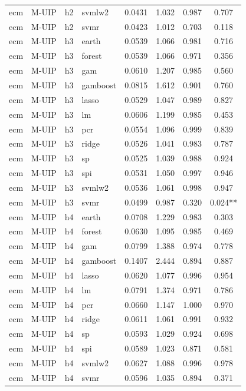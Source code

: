 \begin{ThreePartTable}
\begin{longtable}[t]{llclcccc}
ecm & M-UIP & h2 & svmlw2 & 0.0431 & 1.032 & 0.987 & 0.707\\
ecm & M-UIP & h2 & svmr & 0.0423 & 1.012 & 0.703 & 0.118\\
\addlinespace
ecm & M-UIP & h3 & earth & 0.0539 & 1.066 & 0.981 & 0.716\\
ecm & M-UIP & h3 & forest & 0.0539 & 1.066 & 0.971 & 0.356\\
ecm & M-UIP & h3 & gam & 0.0610 & 1.207 & 0.985 & 0.560\\
ecm & M-UIP & h3 & gamboost & 0.0815 & 1.612 & 0.901 & 0.760\\
ecm & M-UIP & h3 & lasso & 0.0529 & 1.047 & 0.989 & 0.827\\
ecm & M-UIP & h3 & lm & 0.0606 & 1.199 & 0.985 & 0.453\\
ecm & M-UIP & h3 & pcr & 0.0554 & 1.096 & 0.999 & 0.839\\
ecm & M-UIP & h3 & ridge & 0.0526 & 1.041 & 0.983 & 0.787\\
ecm & M-UIP & h3 & sp & 0.0525 & 1.039 & 0.988 & 0.924\\
ecm & M-UIP & h3 & spi & 0.0531 & 1.050 & 0.997 & 0.946\\
ecm & M-UIP & h3 & svmlw2 & 0.0536 & 1.061 & 0.998 & 0.947\\
ecm & M-UIP & h3 & svmr & 0.0499 & 0.987 & 0.320 & 0.024**\\
\addlinespace
ecm & M-UIP & h4 & earth & 0.0708 & 1.229 & 0.983 & 0.303\\
ecm & M-UIP & h4 & forest & 0.0630 & 1.095 & 0.985 & 0.469\\
ecm & M-UIP & h4 & gam & 0.0799 & 1.388 & 0.974 & 0.778\\
ecm & M-UIP & h4 & gamboost & 0.1407 & 2.444 & 0.894 & 0.887\\
ecm & M-UIP & h4 & lasso & 0.0620 & 1.077 & 0.996 & 0.954\\
ecm & M-UIP & h4 & lm & 0.0791 & 1.374 & 0.971 & 0.786\\
ecm & M-UIP & h4 & pcr & 0.0660 & 1.147 & 1.000 & 0.970\\
ecm & M-UIP & h4 & ridge & 0.0611 & 1.061 & 0.991 & 0.932\\
ecm & M-UIP & h4 & sp & 0.0593 & 1.029 & 0.924 & 0.698\\
ecm & M-UIP & h4 & spi & 0.0589 & 1.023 & 0.871 & 0.581\\
ecm & M-UIP & h4 & svmlw2 & 0.0627 & 1.088 & 0.996 & 0.978\\
ecm & M-UIP & h4 & svmr & 0.0596 & 1.035 & 0.894 & 0.371\\

\end{longtable}
\end{ThreePartTable}
